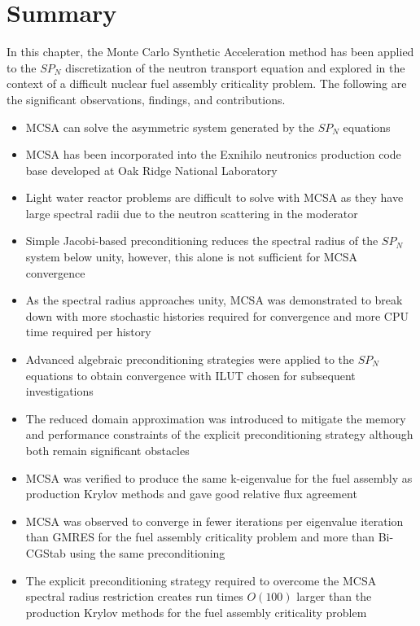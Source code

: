 \section{Summary}
\label{sec:mc_summary}

In this chapter, the Monte Carlo Synthetic Acceleration method has
been applied to the $SP_N$ discretization of the neutron transport
equation and explored in the context of a difficult nuclear fuel
assembly criticality problem. The following are the significant
observations, findings, and contributions.

\begin{itemize}
\item MCSA can solve the asymmetric system generated by the $SP_N$
  equations
\item MCSA has been incorporated into the Exnihilo neutronics
  production code base developed at Oak Ridge National Laboratory
\item Light water reactor problems are difficult to solve with MCSA as
  they have large spectral radii due to the neutron scattering in the
  moderator
\item Simple Jacobi-based preconditioning reduces the spectral radius
  of the $SP_N$ system below unity, however, this alone is not
  sufficient for MCSA convergence
\item As the spectral radius approaches unity, MCSA was demonstrated
  to break down with more stochastic histories required for
  convergence and more CPU time required per history
\item Advanced algebraic preconditioning strategies were applied to
  the $SP_N$ equations to obtain convergence with ILUT chosen for
  subsequent investigations
\item The reduced domain approximation was introduced to mitigate the
  memory and performance constraints of the explicit preconditioning
  strategy although both remain significant obstacles
\item MCSA was verified to produce the same k-eigenvalue for the fuel
  assembly as production Krylov methods and gave good relative flux
  agreement
\item MCSA was observed to converge in fewer iterations per eigenvalue
  iteration than GMRES for the fuel assembly criticality problem and
  more than Bi-CGStab using the same preconditioning
\item The explicit preconditioning strategy required to overcome the
  MCSA spectral radius restriction creates run times $O(100)$ larger
  than the production Krylov methods for the fuel assembly criticality
  problem
\end{itemize}
